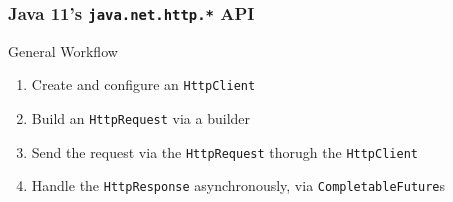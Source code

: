 \documentclass[presentation]{beamer}\mode<presentation>{\usetheme{AMSCesenaPurpleAndGold}}
\begin{document}
\begin{frame}[allowframebreaks]
    \frametitle{Java 11's \texttt{java.net.http.*} API}

    \begin{block}{General Workflow}
        \begin{enumerate}
            \item Create and configure an \texttt{HttpClient}
            \item Build an \texttt{HttpRequest} via a builder
            \item Send the request via the \texttt{HttpRequest} thorugh the \texttt{HttpClient}
            \item Handle the \texttt{HttpResponse} asynchronously, via \texttt{CompletableFuture}s
        \end{enumerate}
    \end{block}


\end{frame}
\end{document}
